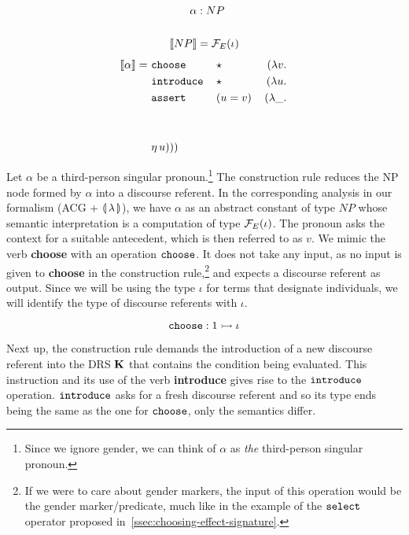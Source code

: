 \hspace{-5mm}
\begin{minipage}{0.63\textwidth}
\crprobox
\end{minipage}
\begin{minipage}{0.36\textwidth}
\vspace{0.4cm}
\begin{align*}
\alpha &: NP \\ \\
\llbracket NP \rrbracket &= \mathcal{F}_E(\iota)
\end{align*}
\vspace{0.1cm}
\begin{align*}
\llbracket \alpha \rrbracket =\ & \mathtt{choose}\,&&\star\, &(\lambda v.\,  \\
                & \mathtt{introduce}\,&&\star\, &(\lambda u.\,  \\
                & \mathtt{assert}\,&&(u = v)\, &(\lambda \_.\,  \\
                \\ \\
                & \eta\,u)))
\end{align*}
\end{minipage}

\vspace{6mm}

Let $\alpha$ be a third-person singular pronoun.\footnote{Since we ignore
  gender, we can think of $\alpha$ as \emph{the} third-person singular
  pronoun.} The construction rule reduces the NP node formed by $\alpha$
into a discourse referent. In the corresponding analysis in our formalism
(ACG + $\llparenthesis \, \lambda \, \rrparenthesis$), we have $\alpha$ as an abstract constant of
type $NP$ whose semantic interpretation is a computation of type
$\mathcal{F}_E(\iota)$. The pronoun asks the context for a suitable antecedent,
which is then referred to as $v$. We mimic the verb \textbf{choose} with an
operation $\mathtt{choose}$. It does not take any input, as no input is given
to \textbf{choose} in the construction rule,\footnote{If we were to care about
  gender markers, the input of this operation would be the gender
  marker/predicate, much like in the example of the $\mathtt{select}$ operator
  proposed in~\ref{ssec:choosing-effect-signature}.} and expects a
discourse referent as output. Since we will be using the type $\iota$ for
terms that designate individuals, we will identify the type of discourse
referents with $\iota$.

$$
\mathtt{choose} : 1 \rightarrowtail \iota
$$

Next up, the construction rule demands the introduction of a new discourse
referent into the DRS $\mathbf{K}$ that contains the condition being
evaluated. This instruction and its use of the verb \textbf{introduce}
gives rise to the $\mathtt{introduce}$ operation. $\mathtt{introduce}$ asks for a
fresh discourse referent and so its type ends being the same as the one for
$\mathtt{choose}$, only the semantics differ.

